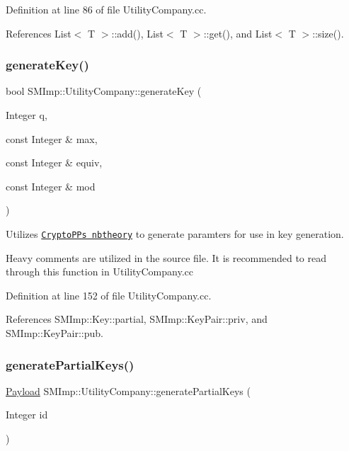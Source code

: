 Definition at line 86 of file Utility\+Company.\+cc.



References List$<$ T $>$\+::add(), List$<$ T $>$\+::get(), and List$<$ T $>$\+::size().

\mbox{\label{classSMImp_1_1UtilityCompany_adeb454bff89a79e454d433bc1ccd448e}} 
\subsubsection{\texorpdfstring{generate\+Key()}{generateKey()}}
{\footnotesize\ttfamily bool S\+M\+Imp\+::\+Utility\+Company\+::generate\+Key (\begin{DoxyParamCaption}\item[{Integer}]{q,  }\item[{const Integer \&}]{max,  }\item[{const Integer \&}]{equiv,  }\item[{const Integer \&}]{mod }\end{DoxyParamCaption})}

Utilizes \href{https://www.cryptopp.com/docs/ref/nbtheory_8h.html#aaef9ef9567713cd9935e468309ebcc9d}{\tt Crypto\+PP\textquotesingle{}s nbtheory} to generate paramters for use in key generation.

Heavy comments are utilized in the source file. It is recommended to read through this function in Utility\+Company.\+cc 

Definition at line 152 of file Utility\+Company.\+cc.



References S\+M\+Imp\+::\+Key\+::partial, S\+M\+Imp\+::\+Key\+Pair\+::priv, and S\+M\+Imp\+::\+Key\+Pair\+::pub.

\mbox{\label{classSMImp_1_1UtilityCompany_accfd3e076199f63e5c52ac909976b46a}} 
\subsubsection{\texorpdfstring{generate\+Partial\+Keys()}{generatePartialKeys()}}
{\footnotesize\ttfamily \hyperlink{structSMImp_1_1Payload}{Payload} S\+M\+Imp\+::\+Utility\+Company\+::generate\+Partial\+Keys (\begin{DoxyParamCaption}\item[{Integer}]{id }\end{DoxyParamCaption})}

